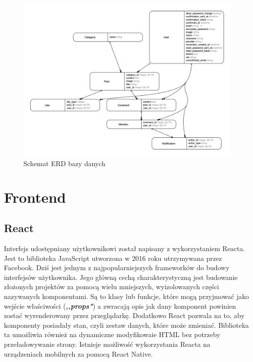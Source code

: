 \documentclass[declaration,shortabstract]{iithesis}
\begin{document}
\begin{figure}
    \centering
    \includegraphics[width=\textwidth]{images/erd.png}
    \caption{Schemat ERD bazy danych}
    \label{fig:erd_diagram}
\end{figure}
\section{Frontend}

\subsection{React}
Interfejs udostępniany użytkownikowi został napisany z wykorzystaniem Reacta. Jest to biblioteka JavaScript utworzona w 2016 roku utrzymywana przez Facebook. Dziś jest jednym z najpopularniejszych frameworków do budowy interfejsów użytkownika. Jego główną cechą charakterystyczną jest budowanie złożonych projektów za pomocą wielu mniejszych, wyizolowanych części nazywanych komponentami. Są to klasy lub funkcje, które mogą przyjmować jako wejście właściwości (\textbf{\textit{,,props"}}) a zwracają opis jak dany komponent powinien zostać wyrenderowany przez przeglądarkę. Dodatkowo React pozwala na to, aby komponenty posiadały stan, czyli zestaw danych, które może zmieniać. Biblioteka ta umożliwia również na dynamiczne modyfikowaie HTML bez potrzeby przeładowywanie strony. Istnieje możliwość wykorzystania Reacta na urządzeniach mobilnych za pomocą React Native.
\end{document}
